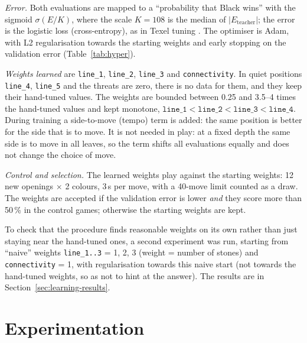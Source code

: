 \documentclass[a4paper,10pt,twocolumn]{article}
\newcommand{\code}[1]{\texttt{#1}}
\begin{document}
\emph{Error.} Both evaluations are mapped to a ``probability that Black wins'' with the sigmoid $\sigma(E/K)$, where the scale $K=108$ is the median of $|E_{\text{teacher}}|$; the error is the logistic loss (cross-entropy), as in Texel tuning \citep{texel}. The optimiser is Adam, with L2 regularisation towards the starting weights and early stopping on the validation error (Table~\ref{tab:hyper}).

\emph{Weights learned} are \code{line\_1}, \code{line\_2}, \code{line\_3} and \code{connectivity}. In quiet positions \code{line\_4}, \code{line\_5} and the threats are zero, there is no data for them, and they keep their hand-tuned values. The weights are bounded between 0.25 and 3.5--4 times the hand-tuned values and kept monotone, $\code{line\_1}<\code{line\_2}<\code{line\_3}<\code{line\_4}$. During training a side-to-move (tempo) term is added: the same position is better for the side that is to move. It is not needed in play: at a fixed depth the same side is to move in all leaves, so the term shifts all evaluations equally and does not change the choice of move.

\emph{Control and selection.} The learned weights play against the starting weights: 12 new openings $\times$ 2 colours, 3\,s per move, with a 40-move limit counted as a draw. The weights are accepted if the validation error is lower \emph{and} they score more than 50\,\% in the control games; otherwise the starting weights are kept.

To check that the procedure finds reasonable weights on its own rather than just staying near the hand-tuned ones, a second experiment was run, starting from ``naive'' weights \code{line\_1..3} = 1, 2, 3 (weight = number of stones) and \code{connectivity} = 1, with regularisation towards this naive start (not towards the hand-tuned weights, so as not to hint at the answer). The results are in Section~\ref{sec:learning-results}.

\section{Experimentation}\label{sec:exp}
\end{document}
